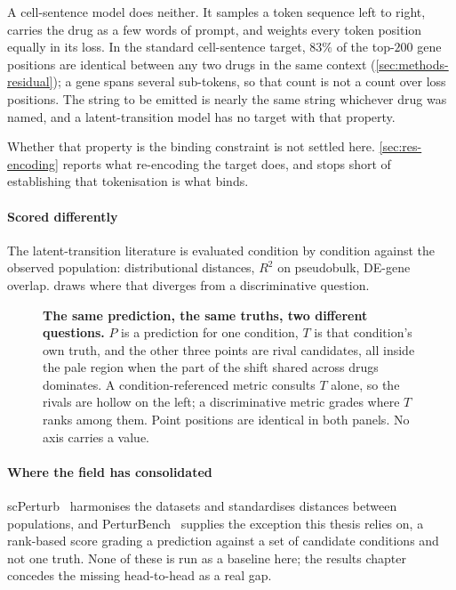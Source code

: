 A cell-sentence model does neither. It samples a token sequence left to right,
carries the drug as a few words of prompt, and weights every token position
equally in its loss. In the standard cell-sentence target, $83\%$ of the
top-$200$ gene positions are identical between any two drugs in the same context
(\cref{sec:methods-residual}); a gene spans several sub-tokens, so that count is
not a count over loss positions. The string to be emitted is nearly the same string
whichever drug was named, and a latent-transition model has no target with that
property.

Whether that property is the binding constraint is not settled here.
\cref{sec:res-encoding} reports what re-encoding the target does, and stops
short of establishing that tokenisation is what binds.

\paragraph{Scored differently} The latent-transition literature is evaluated
condition by condition against the observed population: distributional distances,
$R^2$ on pseudobulk, DE-gene overlap.  draws where that
diverges from a discriminative question.

\begin{figure}[htbp]
\centering

\caption[Two questions about one prediction]{\textbf{The same prediction, the
same truths, two different questions.} $P$ is a prediction for one condition, $T$
is that condition's own truth, and the other three points are rival candidates,
all inside the pale region when the part of the shift shared across drugs
dominates. A
condition-referenced metric consults $T$ alone, so the rivals are hollow on the
left; a discriminative metric grades where $T$ ranks among them. Point positions
are identical in both panels. No axis carries a value.}
\label{fig:two-questions}
\end{figure}

\paragraph{Where the field has consolidated}
scPerturb~\cite{scperturb} harmonises the datasets and standardises distances
between populations, and PerturBench~\cite{perturbench} supplies the
exception this thesis relies on, a rank-based score grading a prediction against
a set of candidate conditions and not one truth. None of these is run as a
baseline here; the results chapter concedes the missing head-to-head as a real
gap.

